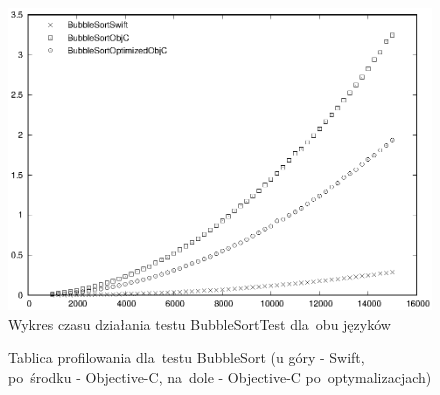\documentclass[mgr, shortabstract]{iithesis}
\begin{document}
\begin{figure}[ht]
    \includegraphics{plots/BubbleSort.eps}
    \caption{Wykres czasu działania testu BubbleSortTest dla~obu języków}
    \label{p:bubble_sort}
\end{figure}

\begin{figure}
    \caption{Tablica profilowania dla~testu BubbleSort (u góry - Swift, po~środku - Objective-C, na~dole - Objective-C po~optymalizacjach)}
    \label{i:bubble_sort}
\end{figure}
\end{document}
